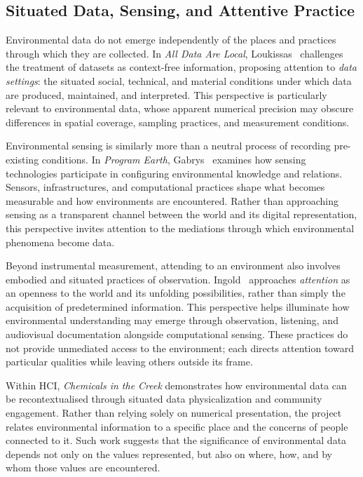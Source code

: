 \documentclass[manuscript,review,anonymous]{acmart}
\begin{document}
\subsection{Situated Data, Sensing, and Attentive Practice}

Environmental data do not emerge independently of the places and practices through which they are collected. In \emph{All Data Are Local}, Loukissas~\cite{loukissas2019} challenges the treatment of datasets as context-free information, proposing attention to \emph{data settings}: the situated social, technical, and material conditions under which data are produced, maintained, and interpreted. This perspective is particularly relevant to environmental data, whose apparent numerical precision may obscure differences in spatial coverage, sampling practices, and measurement conditions.

Environmental sensing is similarly more than a neutral process of recording pre-existing conditions. In \emph{Program Earth}, Gabrys~\cite{gabrys2016} examines how sensing technologies participate in configuring environmental knowledge and relations. Sensors, infrastructures, and computational practices shape what becomes measurable and how environments are encountered. Rather than approaching sensing as a transparent channel between the world and its digital representation, this perspective invites attention to the mediations through which environmental phenomena become data.

Beyond instrumental measurement, attending to an environment also involves embodied and situated practices of observation. Ingold~\cite{ingold2022} approaches \emph{attention} as an openness to the world and its unfolding possibilities, rather than simply the acquisition of predetermined information. This perspective helps illuminate how environmental understanding may emerge through observation, listening, and audiovisual documentation alongside computational sensing. These practices do not provide unmediated access to the environment; each directs attention toward particular qualities while leaving others outside its frame.

Within HCI, \emph{Chemicals in the Creek} \cite{perovich2021} demonstrates how environmental data can be recontextualised through situated data physicalization and community engagement. Rather than relying solely on numerical presentation, the project relates environmental information to a specific place and the concerns of people connected to it. Such work suggests that the significance of environmental data depends not only on the values represented, but also on where, how, and by whom those values are encountered.
\end{document}
